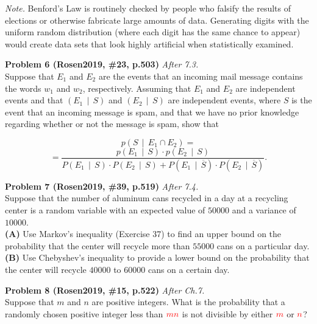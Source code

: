 \documentclass[jou]{apa6}
\begin{document}
{\em Note.} Benford's Law is routinely checked by people who falsify the results of elections 
or otherwise fabricate large amounts of data. 
Generating digits with the uniform random distribution (where each 
digit has the same chance to appear) would create data sets that look highly artificial
when statistically examined.

\vspace{8pt}
{\bf Problem 6 (Rosen2019, \#23, p.503)} \textendash{} {\em After 7.3.}\\
Suppose that $E_1$ and $E_2$ are the events that an incoming mail message contains the words
$w_1$ and $w_2$, respectively. 
Assuming that $E_1$ and $E_2$ are independent events and that $(E_1 \,\mid\, S)$ 
and $(E_2 \,\mid\, S)$ are independent events, 
where $S$ is the event that an incoming message is spam, and that we have 
no prior knowledge regarding whether or not the message is spam, show that


$$p\left( S \,\mid\, E_1 \cap E_2 \right) =$$
$$= \frac{p(E_1 \,\mid\, S) \cdot p(E_2 \,\mid\, S)}{P(E_1 \,\mid\, S) \cdot P(E_2 \,\mid\, S)
+ P(E_1 \,\mid\, \overline{S} ) \cdot P(E_2 \,\mid\, \overline{S} )}.$$

\vspace{8pt}
{\bf Problem 7 (Rosen2019, \#39, p.519)} \textendash{} {\em After 7.4.}\\
Suppose that the number of aluminum cans recycled in a day at a recycling center
is a random variable with an expected value of $50000$ and a variance of $10000$.\\
{\bf (A)} Use Markov's inequality (Exercise 37) to find an upper bound 
on the probability that the center will recycle more than $55000$ cans on a particular day.\\
{\bf (B)} Use Chebyshev's inequality to provide a lower bound on the probability that the center
will recycle $40000$ to $60000$ cans on a certain day.

\vspace{8pt}
{\bf Problem 8 (Rosen2019, \#15, p.522)} \textendash{} {\em After Ch.7.}\\
Suppose that $m$ and $n$ are positive integers. What is the probability that 
a randomly chosen positive integer less than $\textcolor{red}{mn}$ 
is not divisible by either $\textcolor{red}{m}$ or $\textcolor{red}{n}$? 
\end{document}

